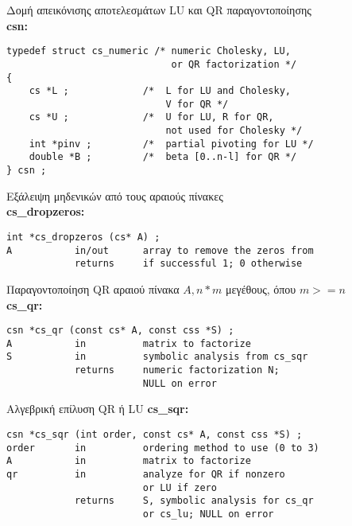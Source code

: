 Δομή απεικόνισης αποτελεσμάτων \textlatin{LU} και \textlatin{QR} παραγοντοποίησης\\
\textbf{csn:}
\begin{verbatim}
typedef struct cs_numeric /* numeric Cholesky, LU, 
                             or QR factorization */
{
    cs *L ;             /*  L for LU and Cholesky, 
                            V for QR */
    cs *U ;             /*  U for LU, R for QR, 
                            not used for Cholesky */
    int *pinv ;         /*  partial pivoting for LU */
    double *B ;         /*  beta [0..n-l] for QR */
} csn ;
\end{verbatim}


Εξάλειψη μηδενικών από τους αραιούς πίνακες\\
\textbf{cs\_dropzeros:}
\begin{verbatim}
int *cs_dropzeros (cs* A) ;
A           in/out      array to remove the zeros from
            returns     if successful 1; 0 otherwise
\end{verbatim}

Παραγοντοποίηση \textlatin{QR} αραιού πίνακα $A, n * m$ μεγέθους, όπου $m >= n$\\
\textbf{cs\_qr:}
\begin{verbatim}
csn *cs_qr (const cs* A, const css *S) ;
A           in          matrix to factorize
S           in          symbolic analysis from cs_sqr
            returns     numeric factorization N;
                        NULL on error
\end{verbatim}


Αλγεβρική επίλυση \textlatin{QR} ή \textlatin{LU}
\textbf{cs\_sqr:}
\begin{verbatim}
csn *cs_sqr (int order, const cs* A, const css *S) ;
order       in          ordering method to use (0 to 3)
A           in          matrix to factorize
qr          in          analyze for QR if nonzero 
                        or LU if zero
            returns     S, symbolic analysis for cs_qr 
                        or cs_lu; NULL on error
\end{verbatim}

